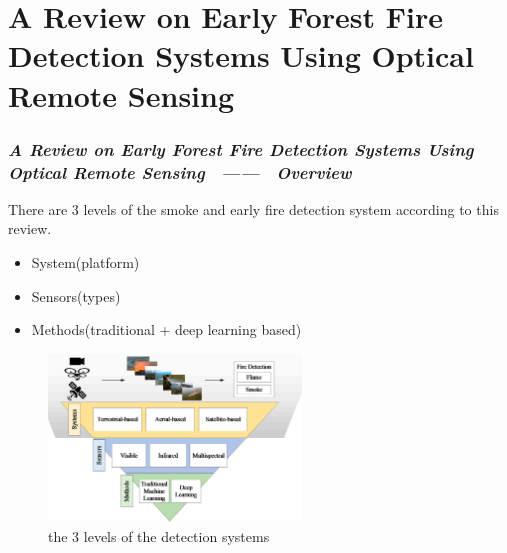 \section{A Review on Early Forest Fire Detection Systems
Using Optical Remote Sensing}

\begin{frame}
    \frametitle{\textit{A Review on Early Forest Fire Detection Systems
Using Optical Remote Sensing ~------~ Overview}}

    There are 3 levels of the smoke and early fire detection system according to
    this review.
    \begin{itemize}
        \item System(platform)
        \item Sensors(types)
        \item Methods(traditional + deep learning based)
    \end{itemize}
    \begin{figure}[H]
        \centering
        \includegraphics[width=0.6\textwidth]{./imgs/levels}
        \caption{the 3 levels of the detection systems}
    \end{figure}

\end{frame}

